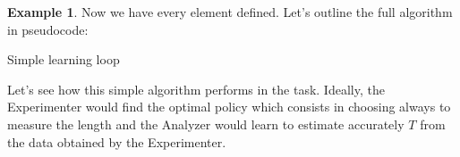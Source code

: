 \documentclass[11pt,a4paper,twoside]{report}
\DeclareMathOperator*{\argmax}{arg\,max}
\newcommand{\+}{\textnormal{+} }
\theoremstyle{definition}
\newtheorem{myex}[mythm]{Example}
\numberwithin{equation}{chapter}
\begin{document}
\begin{myex}
Now we have every element defined. Let's outline the full algorithm in 
pseudocode:

  \makeatletter
  \def\BState{\State\hskip-\ALG@thistlm}
  \makeatother
  \begin{algorithm}
    \caption{Simple learning loop}\label{pendulum}
    \end{algorithm}
\end{myex}

Let's see how this simple algorithm performs in the task. Ideally, the
Experimenter would find the optimal policy which consists in choosing always to
measure the length and the Analyzer would learn to estimate accurately $T$ from
the data obtained by the Experimenter.
\end{document}
